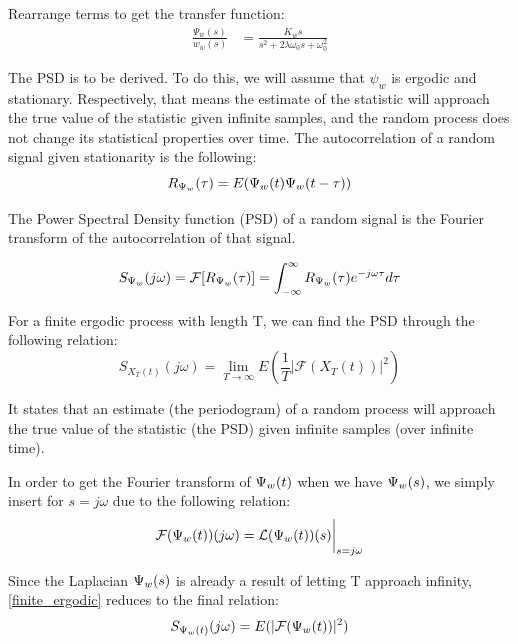 Rearrange terms to get the transfer function:
\begin{align*}
    \frac{\Psi_w(s)}{w_w(s)} &= \frac{K_ws}{s^2 + 2\lambda\omega_0s + \omega^2_0}
\end{align*}

The PSD is to be derived. To do this, we will assume that $\psi_w$ is ergodic and stationary. Respectively, that means the estimate of the statistic will approach the true value of the statistic given infinite samples, and the random process does not change its statistical properties over time. The autocorrelation of a random signal given stationarity is the following:
\begin{equation*}
R_{\Psi_w}(\tau) = E(\Psi_w(t)\Psi_w(t-\tau))
\end{equation*}

The Power Spectral Density function (PSD) of a random signal is the Fourier transform of the autocorrelation of that signal.

\begin{equation*}
    S_{\Psi_w}(j\omega) = \mathcal{F}[R_{\Psi_w}(\tau)] = \int_{-\infty}^{\infty}R_{\Psi_w}(\tau)e^{-j\omega\tau}d\tau
\end{equation*}

For a finite ergodic process with length T, we can find the PSD through the following relation:
\begin{equation}
    S_{X_T(t)}(j\omega) = \lim_{T\to\infty}E(\frac{1}{T}|\mathcal{F}(X_T(t))|^2) \label{finite_ergodic}
\end{equation}

It states that an estimate (the periodogram) of a random process will approach the true value of the statistic (the PSD) given infinite samples (over infinite time).

In order to get the Fourier transform of $\Psi_w(t)$ when we have $\Psi_w(s)$, we simply insert for $s = j\omega$ due to the following relation:
\begin{equation*}
    \mathcal{F}(\Psi_w(t))(j\omega) = \mathcal{L}(\Psi_w(t))(s)\bigg{|}_{s=j\omega}
\end{equation*}

Since the Laplacian $\Psi_w(s)$ is already a result of letting T approach infinity, \cref{finite_ergodic} reduces to the final relation:
\begin{equation}
    S_{\Psi_w(t)}(j\omega) = E(|\mathcal{F}(\Psi_w(t))|^2) \label{infinite_ergodic}
\end{equation}

